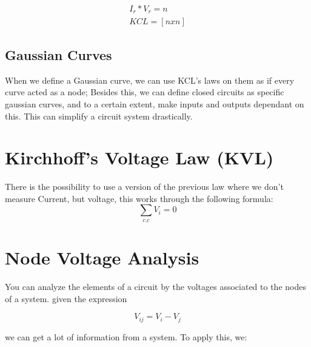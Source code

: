 \documentclass[11pt,fleqn]{book} %
\begin{document}
\begin{gather}
    I_r * V_r = n\\
    KCL = [n x n]
\end{gather}

\subsection{Gaussian Curves}

When we define a Gaussian curve, we can use KCL's laws on them as if every curve acted
as a node; Besides this, we can define closed circuits as specific gaussian curves, and 
to a certain extent, make inputs and outputs dependant on this. This can simplify a circuit 
system drastically.

\section{Kirchhoff's Voltage Law (KVL)}

There is the possibility to use a version of the previous law where
we don't measure Current, but voltage, this works through the following formula:
$$\sum_{c.c}V_{i} = 0$$

\section{Node Voltage Analysis}

You can analyze the elements of a circuit by the voltages associated to the nodes
of a system. given the expression 

$$V_{ij} = V_i - V_j$$

we can get a lot of information from a system. To apply this, we:
\end{document}
